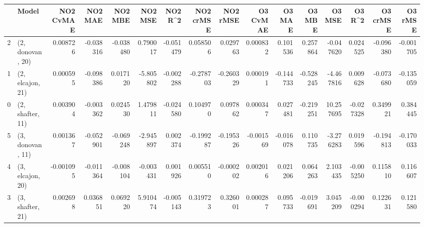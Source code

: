 \begin{tabular}{llrrrrrrrrrrrrrr}
\toprule
{} &             Model &  NO2 CvMAE &   NO2 MAE &   NO2 MBE &   NO2 MSE &   NO2 R\textasciicircum2 &  NO2 crMSE &  NO2 rMSE &  O3 CvMAE &    O3 MAE &    O3 MBE &     O3 MSE &    O3 R\textasciicircum2 &  O3 crMSE &   O3 rMSE \\
\midrule
2 &  (2, donovan, 20) &   0.008726 & -0.038316 & -0.038480 &  0.790017 & -0.051479 &   0.058506 &  0.029763 &  0.000832 &  0.101536 &  0.257864 &  -0.047620 &  0.024525 & -0.096380 & -0.001705 \\
1 &  (2, elcajon, 21) &   0.000595 & -0.098386 &  0.017120 & -5.805802 & -0.002288 &  -0.278703 & -0.260329 &  0.000191 & -0.144733 & -0.528245 &  -4.467816 &  0.009628 & -0.073680 & -0.135059 \\
0 &  (2, shafter, 11) &   0.003904 & -0.003362 &  0.024530 &  1.479811 & -0.024580 &   0.104970 &  0.097862 &  0.000347 &  0.027481 & -0.219251 &  10.257695 & -0.027328 &  0.349921 &  0.384445 \\
5 &  (3, donovan, 11) &   0.001367 & -0.052901 & -0.069248 & -2.945897 &  0.002374 &  -0.199287 & -0.195326 & -0.001569 & -0.016078 &  0.110735 &  -3.276283 &  0.019596 & -0.194813 & -0.170033 \\
4 &  (3, elcajon, 20) &  -0.001095 & -0.011364 & -0.008104 & -0.003431 &  0.001926 &   0.005510 & -0.000202 &  0.002016 &  0.021206 &  0.064263 &   2.103435 & -0.005250 &  0.115810 &  0.116607 \\
3 &  (3, shafter, 21) &   0.002698 &  0.036851 &  0.069220 &  5.910474 & -0.005143 &   0.319723 &  0.326001 &  0.000287 &  0.095733 & -0.019691 &   3.045209 & -0.000294 &  0.122631 &  0.121580 \\
\bottomrule
\end{tabular}
